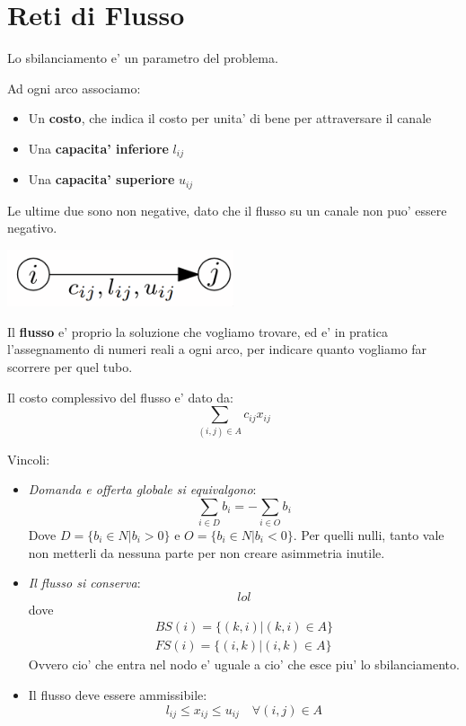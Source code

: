 % 
\chapter{Reti di Flusso}
Lo sbilanciamento e' un parametro del problema.

Ad ogni arco associamo:
\begin{itemize}
\item Un \textbf{costo}, che indica il costo per unita' di bene per attraversare il canale
\item Una \textbf{capacita' inferiore} $ l_{ij} $ 
\item Una \textbf{capacita' superiore} $ u_{ij} $
\end{itemize}

Le ultime due sono non negative, dato che il flusso su un canale non puo' essere negativo.

\begin{center}
  \includegraphics[width=0.5\textwidth]{img/2025-03-05-09-34-49.png}
\end{center}

Il \textbf{flusso} e' proprio la soluzione che vogliamo trovare, ed e' in pratica l'assegnamento di numeri reali a ogni arco, per indicare quanto vogliamo far scorrere per quel tubo.

Il costo complessivo del flusso e' dato da:
\[
  \sum_{(i,j) \in A} c_{ij}x_{ij}
\]

Vincoli:
\begin{itemize}
\item \textit{Domanda e offerta globale si equivalgono}:
  \[
  \sum_{i \in D}b_i = - \sum_{i \in O} b_i
  \]
  Dove $ D = \{b_i \in N | b_i > 0\} $ e $ O = \{b_i \in N | b_i < 0\} $. Per quelli nulli, tanto vale non metterli da nessuna parte per non creare asimmetria inutile.
\item \textit{Il flusso si conserva}:
  \[
 lol 
  \]
dove
\begin{align*}
  BS(i) = \{(k,i) | (k,i) \in A\}\\
  FS(i) = \{(i,k) | (i,k) \in A\}
\end{align*}
Ovvero cio' che entra nel nodo e' uguale a cio' che esce piu' lo sbilanciamento.
\item Il flusso deve essere ammissibile:
  \[
    l_{ij} \leq x_{ij} \leq u_{ij} \quad \forall (i,j) \in A
  \]
\end{itemize}

